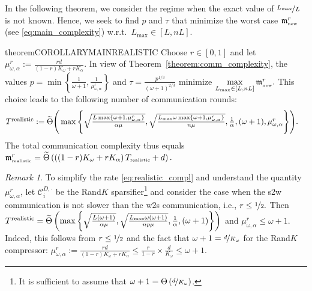 \documentclass{article} %
\newcommand{\cC}{\mathcal{C}}
\theoremstyle{plain}
\theoremstyle{definition}
\theoremstyle{remark}
\newtheorem{remark}[theorem]{Remark}
\newcommand{\eqdef}{:=}
\newcommand{\squeeze}{\textstyle}
\begin{document}
In the following theorem, we consider the regime when the exact value of $\nicefrac{L_{\max}}{L}$ is not known. Hence, we seek to find $p$ and $\tau$ that minimize the worst case $\mathfrak{m}^{r}_{{\scriptscriptstyle \textnormal{new}}}$  (see \eqref{eq:main_complexity}) w.r.t.\ $L_{\max} \in [L, n L].$
\begin{restatable}{theorem}{COROLLARYMAINREALISTIC}
  \label{cor:realistic}
Choose  $r \in [0, 1]$ and let $\mu^r_{\omega, \alpha} \eqdef \frac{rd}{(1 - r) K_{\omega} + r K_{\alpha}}.$ In view of Theorem~\ref{theorem:comm_complexity},
the values $
      p = \min\left\{\frac{1}{\omega + 1}, \frac{1}{\mu^r_{\omega, \alpha}}\right\}$
      and
      $\tau = \frac{p^{1/3}}{(\omega + 1)^{2/3}}$
    minimize $\max\limits_{L_{\max} \in [L, n L]} \mathfrak{m}^{r}_{{\scriptscriptstyle \textnormal{new}}}.$ This choice leads to the following number of communication rounds:
    {\small \begin{align}
      \label{eq:realistic_compl}
 \squeeze     T^{\textnormal{realistic}} &\squeeze \eqdef \widetilde{\Theta}\Bigg(\max\Bigg\{\sqrt{\frac{L \max\{\omega + 1, \mu^r_{\omega, \alpha}\}}{\alpha \mu}},\sqrt{\frac{L_{\max} \omega \max\{\omega + 1, \mu^r_{\omega, \alpha}\}}{n \mu}}, \frac{1}{\alpha}, (\omega + 1), \mu^r_{\omega, \alpha}\Bigg\}\Bigg).
    \end{align}}The total communication complexity thus equals $\mathfrak{m}^{r}_{{\scriptscriptstyle \textnormal{realistic}}} = \widetilde{\Theta}\left(\left((1 - r)K_{\omega} + r K_{\alpha}\right) T_{{\scriptscriptstyle \textnormal{realistic}}} + d\right).$ 
\end{restatable}

\begin{remark}
  \label{rem:realistic}
  To simplify the rate \eqref{eq:realistic_compl} and understand the quantity $\mu^r_{\omega, \alpha}$, let  $\cC_i^{D, \cdot}$  be the Rand$K$ sparsifier\footnote{It is sufficient to assume that $\omega + 1 = \Theta\left(\nicefrac{d}{K_{\omega}}\right)$.} and consider the case when the s2w communication is not slower than the w2s communication, i.e., $r \leq \nicefrac{1}{2}.$ Then
    $
      T^{\textnormal{realistic}} = \widetilde{\Theta}\left(\max\left\{\sqrt{\frac{L (\omega + 1)}{\alpha \mu}},\sqrt{\frac{L_{\max} \omega (\omega + 1)}{n p \mu}}, \frac{1}{\alpha}, (\omega + 1)\right\}\right)$ and $\mu^r_{\omega, \alpha} \leq \omega + 1.
    $  Indeed, this follows from $r \leq \nicefrac{1}{2}$ and the fact that $\omega + 1 = \nicefrac{d}{K_{\omega}}$ for the Rand$K$ compressor:
  $\mu^r_{\omega, \alpha} \eqdef \frac{rd}{(1 - r) K_{\omega} + r K_{\alpha}} \leq \frac{r}{1 - r} \times \frac{d}{K_{\omega}} \leq \omega + 1.$
\end{remark}
\end{document}
